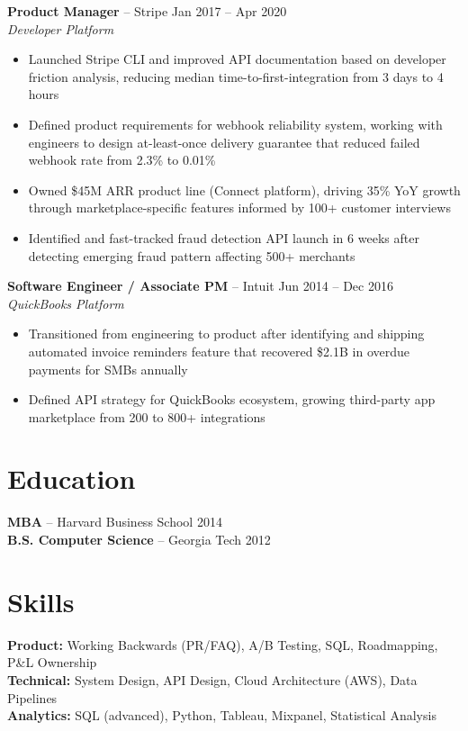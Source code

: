 \documentclass[11pt,letterpaper]{article}
\begin{document}
\textbf{Product Manager} -- Stripe \hfill Jan 2017 -- Apr 2020\\
\textit{Developer Platform}
\begin{itemize}
    \item Launched Stripe CLI and improved API documentation based on developer friction analysis, reducing median time-to-first-integration from 3 days to 4 hours
    \item Defined product requirements for webhook reliability system, working with engineers to design at-least-once delivery guarantee that reduced failed webhook rate from 2.3\% to 0.01\%
    \item Owned \$45M ARR product line (Connect platform), driving 35\% YoY growth through marketplace-specific features informed by 100+ customer interviews
    \item Identified and fast-tracked fraud detection API launch in 6 weeks after detecting emerging fraud pattern affecting 500+ merchants
\end{itemize}

\textbf{Software Engineer / Associate PM} -- Intuit \hfill Jun 2014 -- Dec 2016\\
\textit{QuickBooks Platform}
\begin{itemize}
    \item Transitioned from engineering to product after identifying and shipping automated invoice reminders feature that recovered \$2.1B in overdue payments for SMBs annually
    \item Defined API strategy for QuickBooks ecosystem, growing third-party app marketplace from 200 to 800+ integrations
\end{itemize}

\section{Education}

\textbf{MBA} -- Harvard Business School \hfill 2014\\
\textbf{B.S. Computer Science} -- Georgia Tech \hfill 2012 

\section{Skills}

\textbf{Product:} Working Backwards (PR/FAQ), A/B Testing, SQL, Roadmapping, P\&L Ownership \\
\textbf{Technical:} System Design, API Design, Cloud Architecture (AWS), Data Pipelines \\
\textbf{Analytics:} SQL (advanced), Python, Tableau, Mixpanel, Statistical Analysis
\end{document}

